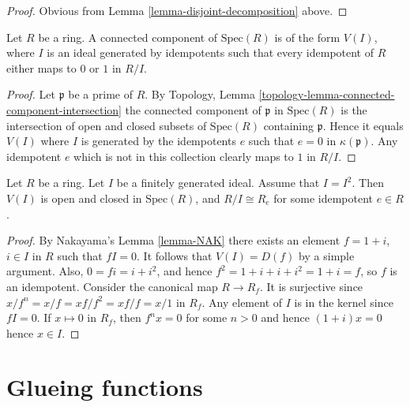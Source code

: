 \begin{proof}
Obvious from Lemma \ref{lemma-disjoint-decomposition} above.
\end{proof}

\begin{lemma}
\label{lemma-connected-component}
Let $R$ be a ring. A connected component of
$\text{Spec}(R)$ is of the form $V(I)$,
where $I$ is an ideal generated by idempotents
such that every idempotent of $R$ either maps to
$0$ or $1$ in $R/I$.
\end{lemma}

\begin{proof}
Let $\mathfrak p$ be a prime of $R$.
By Topology, Lemma \ref{topology-lemma-connected-component-intersection}
the connected component of $\mathfrak p$ in $\text{Spec}(R)$
is the intersection of open and closed subsets of $\text{Spec}(R)$
containing $\mathfrak p$.
Hence it equals $V(I)$ where
$I$ is generated by the idempotents $e$ such that $e = 0$
in $\kappa(\mathfrak p)$. Any idempotent $e$ which is not in
this collection clearly maps to $1$ in $R/I$.
\end{proof}

\begin{lemma}
\label{lemma-ideal-is-squared-union-connected}
Let $R$ be a ring.
Let $I$ be a finitely generated ideal.
Assume that $I = I^2$.
Then $V(I)$ is open and closed in $\text{Spec}(R)$,
and $R/I \cong R_e$ for some idempotent $e \in R$.
\end{lemma}

\begin{proof}
By Nakayama's Lemma \ref{lemma-NAK} there exists an element
$f = 1 + i$, $i \in I$ in $R$ such that $fI = 0$.
It follows that $V(I) = D(f)$ by a simple argument.
Also, $0 = fi = i + i^2$, and hence
$f^2 = 1 + i + i + i^2 = 1 + i = f$, so $f$ is an idempotent.
Consider the canonical map $R \to R_f$. It is surjective
since $x/f^n = x/f = xf/f^2 = xf/f = x/1$ in $R_f$.
Any element of $I$ is in the kernel since $fI = 0$.
If $x \mapsto 0$ in $R_f$, then $f^nx = 0$ for some $n > 0$
and hence $(1 + i)x = 0$ hence $x \in I$.
\end{proof}















\section{Glueing functions}
\label{section-tilde-module-sheaf}


